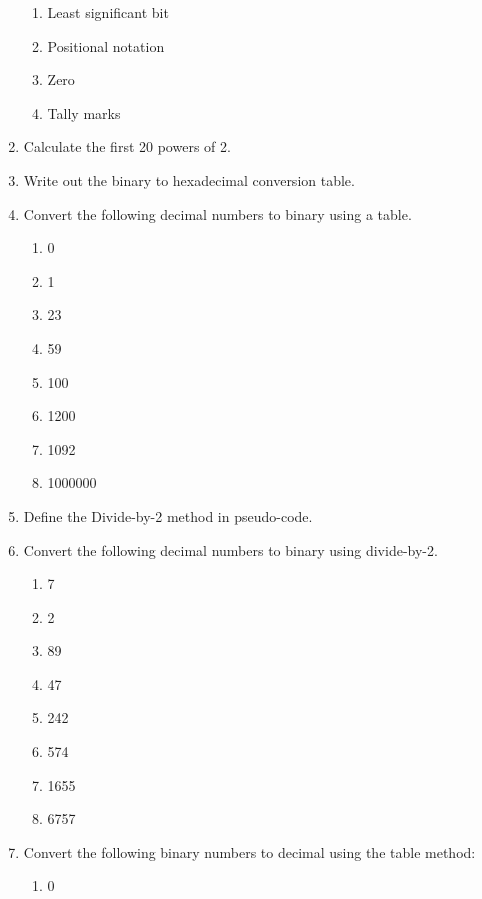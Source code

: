 \begin{multicols*}{2}
\begin{enumerate}[label=\thechapter.\arabic*]
\begin{enumerate}
        \item Least significant bit
        \item Positional notation 
        \item Zero 
        \item Tally marks
    \end{enumerate}
    \item Calculate the first 20 powers of 2.
    \item Write out the binary to hexadecimal conversion table. 
    \item Convert the following decimal numbers to binary using a table.
    \begin{multicols*}{2}
        \begin{enumerate}
            \item 0
            \item 1
            \item 23
            \item 59
            \item 100
            \item 1200
            \item 1092
            \item 1000000
        \end{enumerate}
    \end{multicols*}
    \item Define the Divide-by-2 method in pseudo-code.
    \item Convert the following decimal numbers to binary using \gls{divide-by-2}.
    \begin{multicols*}{2}
        \begin{enumerate}
            \item 7
            \item 2
            \item 89
            \item 47
            \item 242
            \item 574
            \item 1655
            \item 6757
        \end{enumerate}
    \end{multicols*}
    \item Convert the following binary numbers to decimal using the table method:\label{hw:tablemethod}
    \begin{enumerate}
        \item 0

\end{enumerate}
\end{enumerate}
\end{multicols*}
